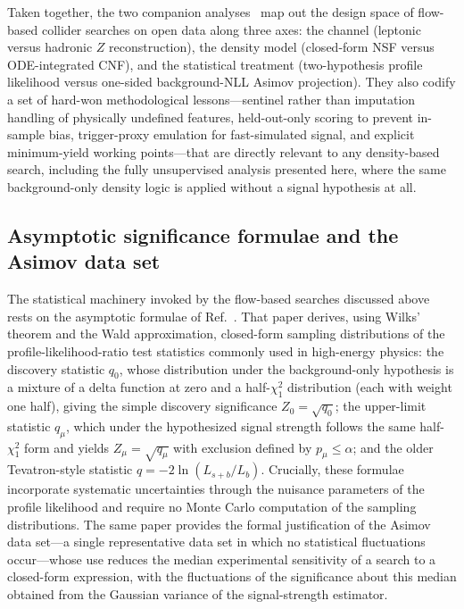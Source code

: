 \documentclass[11pt,a4paper,twocolumn]{article}
\begin{document}
Taken together, the two companion analyses~\cite{Rasineni2026MonoZNSF,Rasineni2026HadronicFlowMatching} map out the design space of flow-based collider searches on open data along three axes: the channel (leptonic versus hadronic $Z$ reconstruction), the density model (closed-form NSF versus ODE-integrated CNF), and the statistical treatment (two-hypothesis profile likelihood versus one-sided background-NLL Asimov projection). They also codify a set of hard-won methodological lessons---sentinel rather than imputation handling of physically undefined features, held-out-only scoring to prevent in-sample bias, trigger-proxy emulation for fast-simulated signal, and explicit minimum-yield working points---that are directly relevant to any density-based search, including the fully unsupervised analysis presented here, where the same background-only density logic is applied without a signal hypothesis at all.

\subsection{Asymptotic significance formulae and the Asimov data set}
\label{sec:lit-cowan}

The statistical machinery invoked by the flow-based searches discussed above rests on the asymptotic formulae of Ref.~\cite{Cowan2011Asymptotic}. That paper derives, using Wilks' theorem and the Wald approximation, closed-form sampling distributions of the profile-likelihood-ratio test statistics commonly used in high-energy physics: the discovery statistic $q_0$, whose distribution under the background-only hypothesis is a mixture of a delta function at zero and a half-$\chi^2_1$ distribution (each with weight one half), giving the simple discovery significance $Z_0=\sqrt{q_0}$; the upper-limit statistic $q_\mu$, which under the hypothesized signal strength follows the same half-$\chi^2_1$ form and yields $Z_\mu=\sqrt{q_\mu}$ with exclusion defined by $p_\mu\le\alpha$; and the older Tevatron-style statistic $q=-2\ln(L_{s+b}/L_b)$. Crucially, these formulae incorporate systematic uncertainties through the nuisance parameters of the profile likelihood and require no Monte Carlo computation of the sampling distributions. The same paper provides the formal justification of the Asimov data set---a single representative data set in which no statistical fluctuations occur---whose use reduces the median experimental sensitivity of a search to a closed-form expression, with the fluctuations of the significance about this median obtained from the Gaussian variance of the signal-strength estimator.
\end{document}
